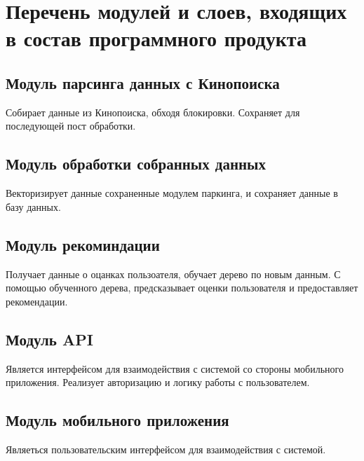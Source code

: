 \section{Перечень модулей и слоев, входящих в состав программного продукта}

\subsection{Модуль парсинга данных с Кинопоиска}
Собирает данные из Кинопоиска, обходя блокировки.
Сохраняет для последующей пост обработки.

\subsection{Модуль обработки собранных данных}
Векторизирует данные сохраненные модулем паркинга, и сохраняет данные в базу данных.

\subsection{Модуль рекоминдации}
Получает данные о оцанках пользоателя, обучает дерево по новым данным.
С помощью обученного дерева, предсказывает оценки пользователя и предоставляет рекомендации.

\subsection{Модуль API}
Является интерфейсом для взаимодействия с системой со стороны мобильного приложения.
Реализует авторизацию и логику работы с пользователем.

\subsection{Модуль мобильного приложения}
Являеться пользовательским интерфейсом для взаимодействия с системой.

